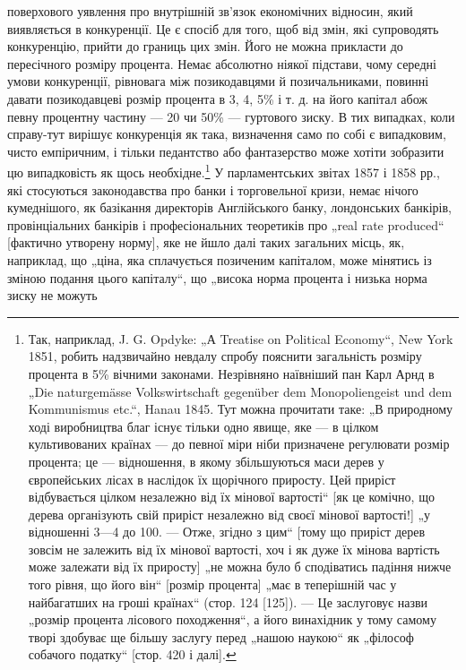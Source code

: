\parcont{}  %
поверхового уявлення про внутрішній зв’язок економічних відносин,
який виявляється в конкуренції. Це є спосіб для того, щоб від
змін, які супроводять конкуренцію, прийти до границь цих змін.
Його не можна прикласти до пересічного розміру процента.
Немає абсолютно ніякої підстави, чому середні умови конкуренції,
рівновага між позикодавцями й позичальниками, повинні давати
позикодавцеві розмір процента в 3, 4, 5\% і т. д. на його капітал
абож певну процентну частину — 20 чи 50\% — гуртового
зиску. В тих випадках, коли справу-тут вирішує конкуренція як
така, визначення само по собі є випадковим, чисто емпіричним,
і тільки педантство або фантазерство може хотіти зобразити
цю випадковість як щось необхідне.\footnote{
Так, наприклад, J. G. Opdyke: „А Treatise on Political Economy“, New
York 1851, робить надзвичайно невдалу спробу пояснити загальність розміру
процента в 5\% вічними законами. Незрівняно наївніший пан Карл Арнд в „Die
naturgemässe Volkswirtschaft gegenüber dem Monopoliengeist und dem Kommunismus
etc.“, Hanau 1845. Тут можна прочитати таке: „В природному ході виробництва
благ існує тільки одно явище, яке — в цілком культивованих країнах — до
певної міри ніби призначене регулювати розмір процента; це — відношення,
в якому збільшуються маси дерев у європейських лісах в наслідок їх щорічного
приросту. Цей приріст відбувається цілком незалежно від їх мінової вартості“
[як це комічно, що дерева організують свій приріст незалежно від своєї мінової
вартості!] „у відношенні 3—4 до 100. — Отже, згідно з цим“ [тому що приріст
дерев зовсім не залежить від їх мінової вартості, хоч і як дуже їх мінова вартість
може залежати від їх приросту] „не можна було б сподіватись падіння
нижче того рівня, що його він“ [розмір процента] „має в теперішній час у
найбагатших на гроші країнах“ (стор. 124 [125]). — Це заслуговує назви „розмір
процента лісового походження“, а його винахідник у тому самому творі здобуває
ще більшу заслугу перед „нашою наукою“ як „філософ собачого податку“
[стор. 420 і далі].
} У парламентських звітах
1857 і 1858 рр., які стосуються законодавства про банки і торговельної
кризи, немає нічого кумеднішого, як базікання директорів
Англійського банку, лондонських банкірів, провінціальних
банкірів і професіональних теоретиків про „real rate produced“
[фактично утворену норму], яке не йшло далі таких загальних
місць, як, наприклад, що „ціна, яка сплачується позиченим
капіталом, може мінятись із зміною подання цього капіталу“,
що „висока норма процента і низька норма зиску не можуть
